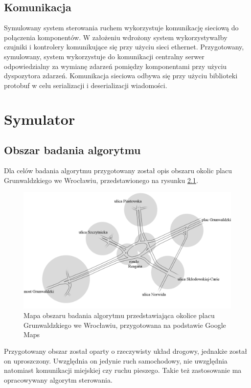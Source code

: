 \section{Komunikacja}
\label{chap:komunikacja}
Symulowany system sterowania ruchem wykorzystuje komunikację sieciową do połączenia komponentów. W założeniu wdrożony system wykorzystywałby czujniki i kontrolery komunikujące się przy użyciu sieci ethernet. Przygotowany, symulowany, system wykorzystuje do komunikacji centralny serwer odpowiedzialny za wymianę zdarzeń pomiędzy komponentami przy użyciu dyspozytora zdarzeń. Komunikacja sieciowa odbywa się przy użyciu biblioteki protobuf \cite{protobuf} w celu serializacji i deserializacji wiadomości.

\chapter{Symulator}
\label{chap:symulacja}
\section{Obszar badania algorytmu}
Dla celów badania algorytmu przygotowany został opis obszaru okolic placu Grunwaldzkiego we Wrocławiu, przedstawionego na rysunku \ref{fig:mapa_czysta}.

\begin{figure}[h]
    \centering
    \includegraphics[width=1.0\textwidth]{images/mapa_czysta.png}
    \caption{Mapa obszaru badania algorytmu przedstawiająca okolice placu Grunwaldzkiego we Wrocławiu, przygotowana na podstawie Google Maps \cite{google_maps}}
    \label{fig:mapa_czysta}
\end{figure}

Przygotowany obszar został oparty o rzeczywisty układ drogowy, jednakże został on uproszczony. Uwzględnia on jedynie ruch samochodowy, nie uwzględnia natomiast komunikacji miejskiej czy ruchu pieszego. Takie też zastosowanie ma opracowywany algorytm sterowania.

